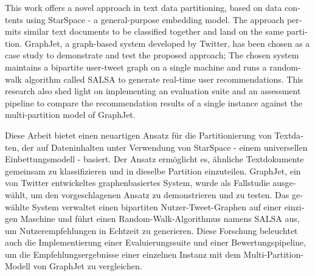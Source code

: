 
\null\vfil
\begin{otherlanguage}{english}
\begin{center}\textsf{\textbf{\abstractname}}\end{center}

\noindent This work offers a novel approach in text data partitioning, based on data contents using StarSpace - a general-purpose embedding model. The approach permits similar text documents to be classified together and land on the same partition. GraphJet, a graph-based system developed by Twitter, has been chosen as a case study to demonstrate and test the proposed approach; The chosen system maintains a bipartite user-tweet graph on a single machine and runs a random-walk algorithm called SALSA to generate real-time user recommendations. This research also shed light on implementing an evaluation suite and an assessment pipeline to compare the recommendation results of a single instance against the multi-partition model of GraphJet.

\end{otherlanguage}
\vfil\null



\null\vfil
\begin{otherlanguage}{ngerman}
\begin{center}\textsf{\textbf{\abstractname}}\end{center}

\noindent Diese Arbeit bietet einen neuartigen Ansatz für die Partitionierung von Textdaten, der auf Dateninhalten unter Verwendung von StarSpace - einem universellen Einbettungsmodell - basiert. Der Ansatz ermöglicht es, ähnliche Textdokumente gemeinsam zu klassifizieren und in dieselbe Partition einzuteilen. GraphJet, ein von Twitter entwickeltes graphenbasiertes System, wurde als Fallstudie ausgewählt, um den vorgeschlagenen Ansatz zu demonstrieren und zu testen. Das gewählte System verwaltet einen bipartiten Nutzer-Tweet-Graphen auf einer einzigen Maschine und führt einen Random-Walk-Algorithmus namens SALSA aus, um Nutzerempfehlungen in Echtzeit zu generieren. Diese Forschung beleuchtet auch die Implementierung einer Evaluierungssuite und einer Bewertungspipeline, um die Empfehlungsergebnisse einer einzelnen Instanz mit dem Multi-Partition-Modell von GraphJet zu vergleichen.


\end{otherlanguage}
\vfil\null



